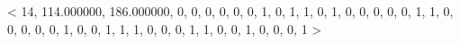 < 14, 114.000000, 186.000000, 0, 0, 0, 0, 0, 0, 1, 0, 1, 1, 0, 1, 0, 0, 0, 0, 0, 1, 1, 0, 0, 0, 0, 0, 1, 0, 0, 1, 1, 1, 0, 0, 0, 1, 1, 0, 0, 1, 0, 0, 0, 1 > 


